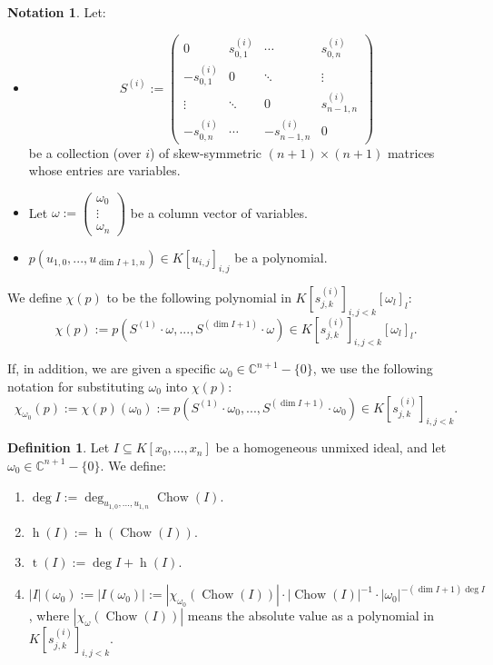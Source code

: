 \documentclass[reqno]{amsart}
\theoremstyle{plain}
\theoremstyle{definition}
\newtheorem{Def}[Cor]{Definition}
\newtheorem{Notation}[Cor]{Notation}
\theoremstyle{remark}
\theoremstyle{plain}
\begin{document}
\begin{Notation}
Let:
\begin{itemize}
    \item \[S^{(i)}:=
    \begin{pmatrix}
    0 & s^{(i)}_{0,1} & \cdots & s^{(i)}_{0,n} \\
    -s^{(i)}_{0,1} & 0 & \ddots & \vdots \\
    \vdots & \ddots & 0 & s^{(i)}_{n-1,n} \\
    -s^{(i)}_{0,n} & \cdots & -s^{(i)}_{n-1,n} & 0
    \end{pmatrix}
    \]
be a collection (over $i$) of skew-symmetric $(n+1)\times(n+1)$ matrices whose entries are variables.
    \item Let $\omega:=
    \begin{pmatrix}
    \omega_0 \\
    \vdots \\
    \omega_n
    \end{pmatrix}
    $ be a column vector of variables.
    \item $p(u_{1,0},...,u_{\dim I+1,n})\in K[u_{i,j}]_{i,j}$ be a polynomial.
\end{itemize}

We define $\chi(p)$ to be the following polynomial in $K[s_{j,k}^{(i)}]_{i,j<k}[\omega_l]_l$:
\[
    \chi(p)
        :=
    p(S^{(1)}\cdot\omega,...,S^{(\dim I+1)}\cdot\omega)
    \in
     K[s_{j,k}^{(i)}]_{i,j<k}[\omega_l]_l
.\]

If, in addition, we are given a specific $\omega_0\in\mathbb C^{n+1}-\{0\}$, we use the following notation for substituting $\omega_0$ into $\chi(p)$:
\[
    \chi_{\omega_0}(p)
        :=
    \chi(p)(\omega_0)
        :=
    p(S^{(1)}\cdot\omega_0,...,S^{(\dim I+1)}\cdot\omega_0)
    \in
     K[s_{j,k}^{(i)}]_{i,j<k}
.\]
\end{Notation}

\begin{Def}\label{definition of deg I, h(I), t(I), I(omega)}
Let $I\subseteq K[x_0,...,x_n]$ be a homogeneous unmixed ideal, and let $\omega_0\in\mathbb C^{n+1}-\{0\}$. We define:
\begin{enumerate}
    \item $\deg I:=\deg_{u_{1,0},...,u_{1,n}}\operatorname{Chow}(I)$.
    \item $\operatorname{h}(I):=\operatorname{h}(\operatorname{Chow}(I))$.
\item $\operatorname{t}(I):=\deg I+\operatorname{h}(I)$.
    \item $|I|(\omega_0):=|I(\omega_0)|:=|\chi_{\omega_0}(\operatorname{Chow}(I))|\cdot|\operatorname{Chow}(I)|^{-1}\cdot|\omega_0|^{-(\dim I + 1)\deg I}$,
where $|\chi_\omega(\operatorname{Chow}(I))|$ means the absolute value as a polynomial in $K[s_{j,k}^{(i)}]_{i,j<k}$.
\end{enumerate}
\end{Def}
\end{document}
